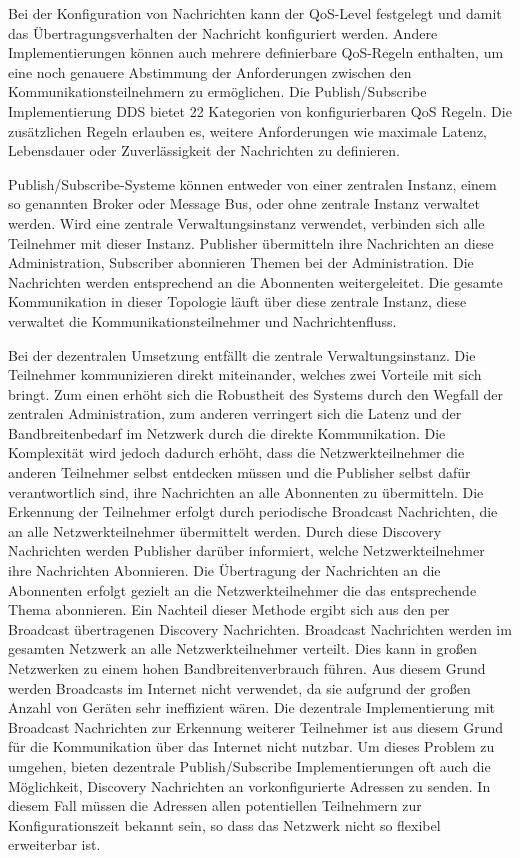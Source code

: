 Bei der Konfiguration von Nachrichten kann der \gls{QoS}-Level festgelegt und damit das Übertragungsverhalten der Nachricht konfiguriert werden. Andere Implementierungen können auch mehrere definierbare \gls{QoS}-Regeln enthalten, um eine noch genauere Abstimmung der Anforderungen zwischen den Kommunikationsteilnehmern zu ermöglichen. Die Publish/Subscribe Implementierung \gls{DDS} bietet 22 Kategorien von konfigurierbaren \gls{QoS} Regeln. Die zusätzlichen Regeln erlauben es, weitere Anforderungen wie maximale Latenz, Lebensdauer oder Zuverlässigkeit der Nachrichten zu definieren. 

Publish/Subscribe-Systeme können entweder von einer zentralen Instanz, einem so genannten Broker oder Message Bus, oder ohne zentrale Instanz verwaltet werden. Wird eine zentrale Verwaltungsinstanz verwendet, verbinden sich alle Teilnehmer mit dieser Instanz. Publisher übermitteln ihre Nachrichten an diese Administration, Subscriber abonnieren Themen bei der Administration. Die Nachrichten werden entsprechend an die Abonnenten weitergeleitet. Die gesamte Kommunikation in dieser Topologie läuft über diese zentrale Instanz, diese verwaltet die Kommunikationsteilnehmer und Nachrichtenfluss.

Bei der dezentralen Umsetzung entfällt die zentrale Verwaltungsinstanz. Die Teilnehmer kommunizieren direkt miteinander, welches zwei Vorteile mit sich bringt. Zum einen erhöht sich die Robustheit des Systems durch den Wegfall der zentralen Administration, zum anderen verringert sich die Latenz und der Bandbreitenbedarf im Netzwerk durch die direkte Kommunikation. Die Komplexität wird jedoch dadurch erhöht, dass die Netzwerkteilnehmer die anderen Teilnehmer selbst entdecken 
müssen und die Publisher selbst dafür verantwortlich sind, ihre Nachrichten an alle Abonnenten zu übermitteln. Die Erkennung der Teilnehmer erfolgt durch periodische Broadcast Nachrichten, die an alle Netzwerkteilnehmer übermittelt werden. Durch diese Discovery Nachrichten werden Publisher darüber informiert, welche Netzwerkteilnehmer ihre Nachrichten Abonnieren. Die Übertragung der Nachrichten an die Abonnenten erfolgt gezielt an die Netzwerkteilnehmer die das entsprechende Thema abonnieren. Ein Nachteil dieser Methode ergibt sich aus den per Broadcast übertragenen Discovery Nachrichten. Broadcast Nachrichten werden im gesamten Netzwerk an alle Netzwerkteilnehmer verteilt. Dies kann in großen Netzwerken zu einem hohen Bandbreitenverbrauch führen. Aus diesem Grund werden Broadcasts im Internet nicht verwendet, da sie aufgrund der großen Anzahl von Geräten sehr ineffizient wären. Die dezentrale Implementierung mit Broadcast Nachrichten zur Erkennung weiterer Teilnehmer ist aus diesem Grund für die Kommunikation über das Internet nicht nutzbar. Um dieses Problem zu umgehen, bieten dezentrale Publish/Subscribe Implementierungen oft auch die Möglichkeit, Discovery Nachrichten an vorkonfigurierte Adressen zu senden. In diesem Fall müssen die Adressen allen potentiellen Teilnehmern zur Konfigurationszeit bekannt sein, so dass das Netzwerk nicht so flexibel erweiterbar ist.

